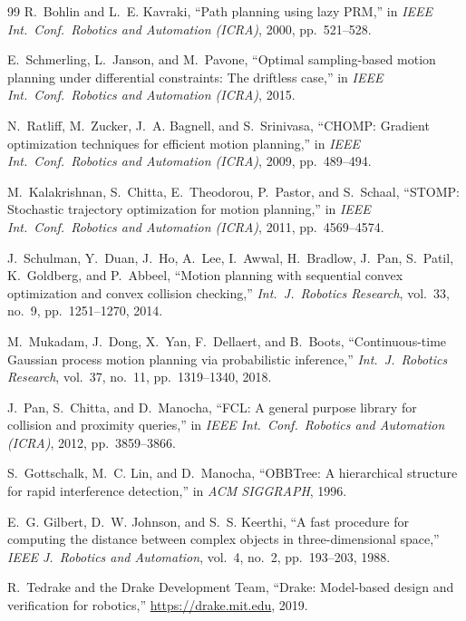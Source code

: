 \documentclass[journal]{IEEEtran}
\begin{document}
\begin{thebibliography}{99}
R.~Bohlin and L.~E. Kavraki, ``Path planning using lazy PRM,'' in
\emph{IEEE Int.\ Conf.\ Robotics and Automation (ICRA)}, 2000,
pp.~521--528.

E.~Schmerling, L.~Janson, and M.~Pavone, ``Optimal sampling-based
motion planning under differential constraints: The driftless case,''
in \emph{IEEE Int.\ Conf.\ Robotics and Automation (ICRA)}, 2015.

N.~Ratliff, M.~Zucker, J.~A. Bagnell, and S.~Srinivasa, ``CHOMP:
Gradient optimization techniques for efficient motion planning,'' in
\emph{IEEE Int.\ Conf.\ Robotics and Automation (ICRA)}, 2009,
pp.~489--494.

M.~Kalakrishnan, S.~Chitta, E.~Theodorou, P.~Pastor, and S.~Schaal,
``STOMP: Stochastic trajectory optimization for motion planning,''
in \emph{IEEE Int.\ Conf.\ Robotics and Automation (ICRA)}, 2011,
pp.~4569--4574.

J.~Schulman, Y.~Duan, J.~Ho, A.~Lee, I.~Awwal, H.~Bradlow, J.~Pan,
S.~Patil, K.~Goldberg, and P.~Abbeel, ``Motion planning with
sequential convex optimization and convex collision checking,''
\emph{Int.\ J.\ Robotics Research}, vol.~33, no.~9, pp.~1251--1270,
2014.

M.~Mukadam, J.~Dong, X.~Yan, F.~Dellaert, and B.~Boots, ``Continuous-time
Gaussian process motion planning via probabilistic
inference,'' \emph{Int.\ J.\ Robotics Research}, vol.~37, no.~11,
pp.~1319--1340, 2018.

J.~Pan, S.~Chitta, and D.~Manocha, ``FCL: A general purpose library
for collision and proximity queries,'' in \emph{IEEE Int.\ Conf.\
Robotics and Automation (ICRA)}, 2012, pp.~3859--3866.

S.~Gottschalk, M.~C. Lin, and D.~Manocha, ``OBBTree: A hierarchical
structure for rapid interference detection,'' in \emph{ACM SIGGRAPH},
1996.

E.~G. Gilbert, D.~W. Johnson, and S.~S. Keerthi, ``A fast procedure
for computing the distance between complex objects in
three-dimensional space,'' \emph{IEEE J.\ Robotics and Automation},
vol.~4, no.~2, pp.~193--203, 1988.

R.~Tedrake and the Drake Development Team, ``Drake: Model-based
design and verification for robotics,'' \url{https://drake.mit.edu},
2019.


\end{thebibliography}
\end{document}
